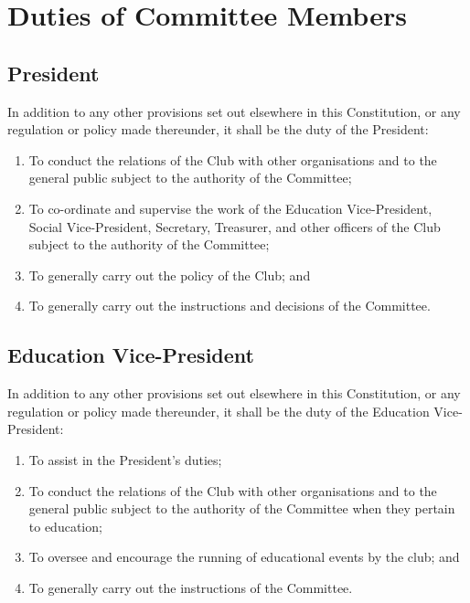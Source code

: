\documentclass[11pt]{article} %
\begin{document}
\section{Duties of Committee Members}
\subsection{President}
In addition to any other provisions set out elsewhere in this Constitution, or any regulation or policy made thereunder, it shall be the duty of the President:
\begin{enumerate}
	\item To conduct the relations of the Club with other organisations and to the general public subject to the authority of the Committee;
	\item To co-ordinate and supervise the work of the Education Vice-President, Social Vice-President, Secretary, Treasurer, and other officers of the Club subject to the authority of the Committee;
	\item To generally carry out the policy of the Club; and
	\item To generally carry out the instructions and decisions of the Committee.
\end{enumerate}

\subsection{Education Vice-President}
In addition to any other provisions set out elsewhere in this Constitution, or any regulation or policy made thereunder, it shall be the duty of the Education Vice-President:
\begin{enumerate}
	\item To assist in the President's duties;
	\item To conduct the relations of the Club with other organisations and to the general public subject to the authority of the Committee when they pertain to education;
	\item To oversee and encourage the running of educational events by the club; and
	\item To generally carry out the instructions of the Committee.
\end{enumerate}
\end{document}
